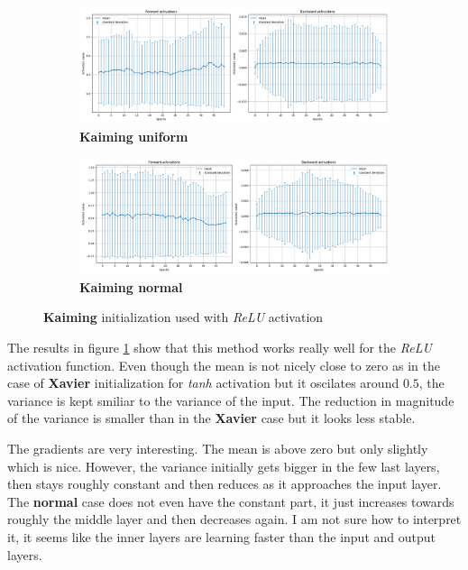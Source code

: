 \documentclass[a4paper,11pt]{article}
\begin{document}
\begin{figure}[ht]
    \centering
    \begin{subfigure}[b]{0.95\textwidth}
        \includegraphics[width=\textwidth]{../out/01_deep/relu_kaiming_uniform.png}
        \caption{\textbf{Kaiming uniform}}
    \end{subfigure}
    \begin{subfigure}[b]{0.95\textwidth}
        \includegraphics[width=\textwidth]{../out/01_deep/relu_kaiming_normal.png}
        \caption{\textbf{Kaiming normal}}
    \end{subfigure}
    \caption{\textbf{Kaiming} initialization used with \textit{ReLU} activation}
    \label{fig:kaiming_relu}
\end{figure}

The results in figure \ref{fig:kaiming_relu} show that this method works really well for the \textit{ReLU} activation function.
Even though the mean is not nicely close to zero as in the case of \textbf{Xavier} initialization for \textit{tanh} activation but it oscilates around $0.5$, the variance is kept smiliar to the variance of the input.
The reduction in magnitude of the variance is smaller than in the \textbf{Xavier} case but it looks less stable.

The gradients are very interesting.
The mean is above zero but only slightly which is nice.
However, the variance initially gets bigger in the few last layers, then stays roughly constant and then reduces as it approaches the input layer.
The \textbf{normal} case does not even have the constant part, it just increases towards roughly the middle layer and then decreases again.
I am not sure how to interpret it, it seems like the inner layers are learning faster than the input and output layers.
\end{document}

